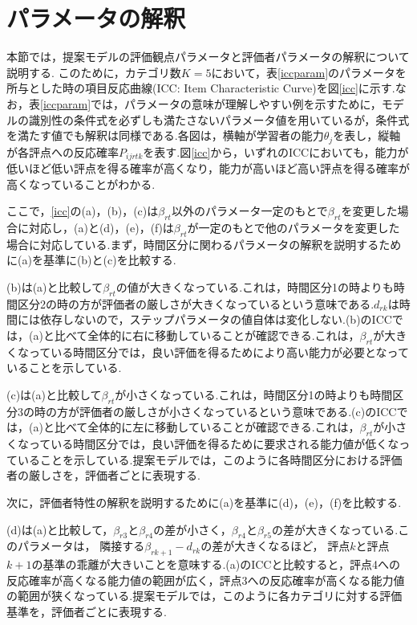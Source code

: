 \documentclass[a4paper,11pt,oneside,openany]{jsbook}
\begin{document}
\section{パラメータの解釈}
本節では，提案モデルの評価観点パラメータと評価者パラメータの解釈について説明する.
このために，カテゴリ数$K=5$において，表\ref{iccparam}のパラメータを所与とした時の項目反応曲線(ICC: Item Characteristic Curve)を図\ref{icc}に示す.なお，表\ref{iccparam}では，パラメータの意味が理解しやすい例を示すために，モデルの識別性の条件式を必ずしも満たさないパラメータ値を用いているが，条件式を満たす値でも解釈は同様である.各図は，横軸が学習者の能力$\theta_j$を表し，縦軸が各評点への反応確率$P_{ijrtk}$を表す.図\ref{icc}から，いずれのICCにおいても，能力が低いほど低い評点を得る確率が高くなり，能力が高いほど高い評点を得る確率が高くなっていることがわかる.

ここで，\ref{icc}の(a)，(b)，(c)は$\beta_{rt}$以外のパラメータ一定のもとで$\beta_{rt}$を変更した場合に対応し，(a)と(d)，(e)，(f)は$\beta_{rt}$が一定のもとで他のパラメータを変更した場合に対応している.まず，時間区分に関わるパラメータの解釈を説明するために(a)を基準に(b)と(c)を比較する.

(b)は(a)と比較して$\beta_{rt}$の値が大きくなっている.これは，時間区分1の時よりも時間区分2の時の方が評価者の厳しさが大きくなっているという意味である.$d_{rk}$は時間には依存しないので，ステップパラメータの値自体は変化しない.(b)のICCでは，(a)と比べて全体的に右に移動していることが確認できる.これは，$\beta_{rt}$が大きくなっている時間区分では，良い評価を得るためにより高い能力が必要となっていることを示している.

(c)は(a)と比較して$\beta_{rt}$が小さくなっている.これは，時間区分1の時よりも時間区分3の時の方が評価者の厳しさが小さくなっているという意味である.(c)のICCでは，(a)と比べて全体的に左に移動していることが確認できる.これは，$\beta_{rt}$が小さくなっている時間区分では，良い評価を得るために要求される能力値が低くなっていることを示している.提案モデルでは，このように各時間区分における評価者の厳しさを，評価者ごとに表現する.

次に，評価者特性の解釈を説明するために(a)を基準に(d)，(e)，(f)を比較する.

(d)は(a)と比較して，$\beta_{r3}$と$\beta_{r4}$の差が小さく，$\beta_{r4}$と$\beta_{r5}$の差が大きくなっている.このパラメータは， 隣接する$\beta_{rk+1} − d_{rk}$の差が大きくなるほど， 評点$k$と評点$k+1$の基準の乖離が大きいことを意味する.(a)のICCと比較すると，評点4への反応確率が高くなる能力値の範囲が広く，評点3への反応確率が高くなる能力値の範囲が狭くなっている.提案モデルでは，このように各カテゴリに対する評価基準を，評価者ごとに表現する.
\end{document}
